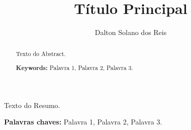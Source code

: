 \documentclass[12pt]{article}
\title{Título Principal}
\author{Dalton Solano dos Reis\inst{1}}
\begin{document}
 


\maketitle

\begin{abstract}
Texto do Abstract.

\textbf{Keywords:} Palavra 1, Palavra 2, Palavra 3.
\end{abstract}
     
\begin{resumo} 
Texto do Resumo.

\textbf{Palavras chaves:} Palavra 1, Palavra 2, Palavra 3.
\end{resumo}










% 



% 

\appendix
\renewcommand{\thesection}{Apêndice \Alph{section}}




\end{document}
